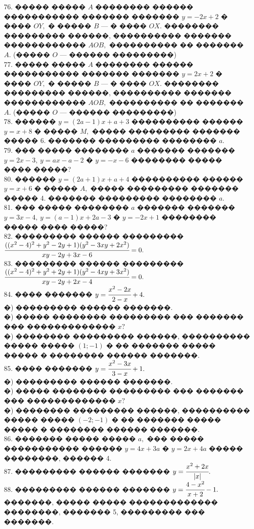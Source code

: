 \documentclass[12pt]{article}
\begin{document}
76. ����� ����� $A$ �������� ������ ����������� ������� ������� $y=-2x+2$ � ���� $OY,$ � ����� $B$ --- � ���� $OX.$ �������� ��������� ������, ���������� ������� ������������ $AOB,$ ���������� �� ������� $A.$ (����� $O$ --- ������ ���������)\\
77. ����� ����� $A$ �������� ������ ����������� ������� ������� $y=2x+2$ � ���� $OY,$ � ����� $B$ --- � ���� $OX.$ �������� ��������� ������, ���������� ������� ������������ $AOB,$ ���������� �� ������� $A.$ (����� $O$ --- ������ ���������)\\
78. ������ $y=(2a-1)x+a+3$ ���������� ������ $y=x+8$ � ����� $M,$ ����� ��������� ������� ����� 6. ������� ��������� �������� $a.$\\
79. ��� ����� �������� $a$ ������� ������� $y=2x-3,\ y=ax-a-2$ � $y=-x-6$ �������� ����� ���� �����?\\
80. ������ $y=(2a+1)x+a+4$ ���������� ������ $y=x+6$ � ����� $A,$ ����� ��������� ������� ����� 4. ������� ��������� �������� $a.$\\
81. ��� ����� �������� $a$ ������� ������� $y=3x-4,\ y=(a-1)x+2a-3$ � $y=-2x+1$ �������� ����� ���� �����?\\
82. ��������� ������ ��������� $\cfrac{((x^2-4)^2+y^2-2y+1)(y^2-3xy+2x^2)}{xy-2y+3x-6}=0.$\\
83. ��������� ������ ��������� $\cfrac{((x^2-4)^2+y^2+2y+1)(y^2-4xy+3x^2)}{xy-2y+2x-4}=0.$\\
84. ���� ������� $y=\cfrac{x^2-2x}{2-x}+4.$\\
�) ��������� ������ �������.\\
�) ����� �������� ��������� ��� ������� ��� ������������� $x?$\\
�) �������� ��������� ������, ���������� ����� ����� $(1;-1)$ � �� ������� ����� ����� � �������� ������ �������.\\
85. ���� ������� $y=\cfrac{x^2-3x}{3-x}+1.$\\
�) ��������� ������ �������.\\
�) ����� �������� ��������� ��� ������� ��� ������������� $x?$\\
�) �������� ��������� ������, ���������� ����� ����� $(-2;-1)$ � �� ������� ����� ����� � �������� ������ �������.\\
86. ������� ����� ����� $a,$ ��� ����� ����������� ������ $y=4x+3a$ � $y=2x+4a$ ����� ��������, ������ 4.\\
87. ��������� ������ ������� $y=\cfrac{x^2+2x}{|x|}.$\\
88. ��������� ������ ������� $y=\cfrac{4-x^2}{x+2}-1.$ �������, ����� ����� ������������� ��������, ������� 5, ��������� ��� �������.\\
\end{document}
